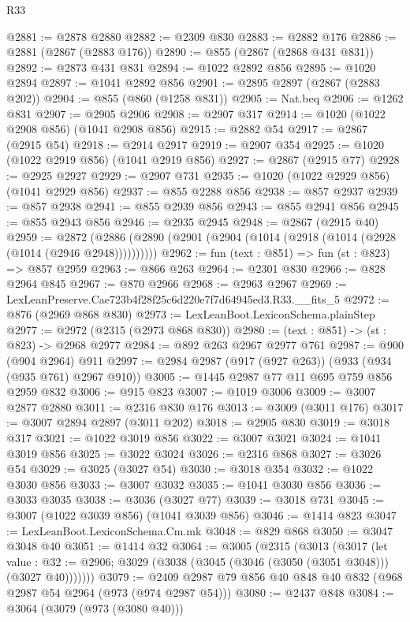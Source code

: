 \begin{lexlean}{R33}
\begin{coremodule}
@2881 := @2878 @2880
@2882 := @2309 @830
@2883 := @2882 @176
@2886 := @2881 (@2867 (@2883 @176))
@2890 := @855 (@2867 (@2868 @431 @831))
@2892 := @2873 @431 @831
@2894 := @1022 @2892 @856
@2895 := @1020 @2894
@2897 := @1041 @2892 @856
@2901 := @2895 @2897 (@2867 (@2883 @202))
@2904 := @855 (@860 (@1258 @831))
@2905 := Nat.beq
@2906 := @1262 @831
@2907 := @2905 @2906
@2908 := @2907 @317
@2914 := @1020 (@1022 @2908 @856) (@1041 @2908 @856)
@2915 := @2882 @54
@2917 := @2867 (@2915 @54)
@2918 := @2914 @2917
@2919 := @2907 @354
@2925 := @1020 (@1022 @2919 @856) (@1041 @2919 @856)
@2927 := @2867 (@2915 @77)
@2928 := @2925 @2927
@2929 := @2907 @731
@2935 := @1020 (@1022 @2929 @856) (@1041 @2929 @856)
@2937 := @855 @2288 @856
@2938 := @857 @2937
@2939 := @857 @2938
@2941 := @855 @2939 @856
@2943 := @855 @2941 @856
@2945 := @855 @2943 @856
@2946 := @2935 @2945
@2948 := @2867 (@2915 @40)
@2959 := @2872 (@2886 (@2890 (@2901 (@2904 (@1014 (@2918 (@1014 (@2928 (@1014 (@2946 @2948))))))))))
@2962 := fun (text : @851) => fun (st : @823) => @857 @2959
@2963 := @866 @263
@2964 := @2301 @830
@2966 := @828 @2964 @845
@2967 := @870 @2966
@2968 := @2963 @2967
@2969 := LexLeanPreserve.Cae723b4f28f25c6d220e7f7d64945ed3.R33.__fits_5
@2972 := @876 (@2969 @868 @830)
@2973 := LexLeanBoot.LexiconSchema.plainStep
@2977 := @2972 (@2315 (@2973 @868 @830))
@2980 := (text : @851) -> (st : @823) -> @2968 @2977
@2984 := @892 @263 @2967 @2977 @761
@2987 := @900 (@904 @2964) @911
@2997 := @2984 @2987 (@917 (@927 @263)) (@933 (@934 (@935 @761) @2967 @910))
@3005 := @1445 @2987 @77 @11 @695 @759 @856 @2959 @832
@3006 := @915 @823
@3007 := @1019 @3006
@3009 := @3007 @2877 @2880
@3011 := @2316 @830 @176
@3013 := @3009 (@3011 @176)
@3017 := @3007 @2894 @2897 (@3011 @202)
@3018 := @2905 @830
@3019 := @3018 @317
@3021 := @1022 @3019 @856
@3022 := @3007 @3021
@3024 := @1041 @3019 @856
@3025 := @3022 @3024
@3026 := @2316 @868
@3027 := @3026 @54
@3029 := @3025 (@3027 @54)
@3030 := @3018 @354
@3032 := @1022 @3030 @856
@3033 := @3007 @3032
@3035 := @1041 @3030 @856
@3036 := @3033 @3035
@3038 := @3036 (@3027 @77)
@3039 := @3018 @731
@3045 := @3007 (@1022 @3039 @856) (@1041 @3039 @856)
@3046 := @1414 @823
@3047 := LexLeanBoot.LexiconSchema.Cm.mk
@3048 := @829 @868
@3050 := @3047 @3048 @40
@3051 := @1414 @32
@3064 := @3005
    (@2315
      (@3013
        (@3017
          (let value : @32 := @2906;
          @3029 (@3038 (@3045 (@3046 (@3050 (@3051 @3048))) (@3027 @40)))))))
@3079 := @2409 @2987 @79 @856 @40 @848 @40 @832 (@968 @2987 @54 @2964 (@973 (@974 @2987 @54)))
@3080 := @2437 @848
@3084 := @3064 (@3079 (@973 (@3080 @40)))

\end{coremodule}
\end{lexlean}
